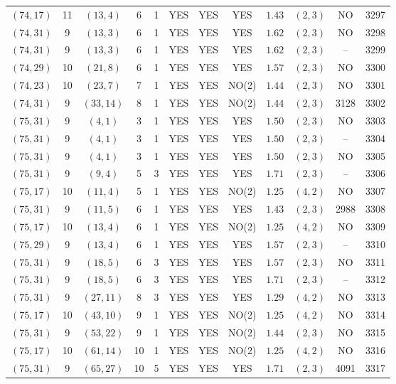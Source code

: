 \begin{longtable}{|c|c|c|c|c|c|c|c|c|c|c|c|}
$(74,17)$ & 11 & $(13,4)$ & 6 & 1 & YES & YES & YES & $1.43$ & $(2,3)$ & NO & 3297\\
$(74,31)$ & 9 & $(13,3)$ & 6 & 1 & YES & YES & YES & $1.62$ & $(2,3)$ & NO & 3298\\
$(74,31)$ & 9 & $(13,3)$ & 6 & 1 & YES & YES & YES & $1.62$ & $(2,3)$ & -- & 3299\\
$(74,29)$ & 10 & $(21,8)$ & 6 & 1 & YES & YES & YES & $1.57$ & $(2,3)$ & NO & 3300\\
$(74,23)$ & 10 & $(23,7)$ & 7 & 1 & YES & YES & NO(2) & $1.44$ & $(2,3)$ & NO & 3301\\
$(74,31)$ & 9 & $(33,14)$ & 8 & 1 & YES & YES & NO(2) & $1.44$ & $(2,3)$ & 3128 & 3302\\
$(75,31)$ & 9 & $(4,1)$ & 3 & 1 & YES & YES & YES & $1.50$ & $(2,3)$ & NO & 3303\\
$(75,31)$ & 9 & $(4,1)$ & 3 & 1 & YES & YES & YES & $1.50$ & $(2,3)$ & -- & 3304\\
$(75,31)$ & 9 & $(4,1)$ & 3 & 1 & YES & YES & YES & $1.50$ & $(2,3)$ & NO & 3305\\
$(75,31)$ & 9 & $(9,4)$ & 5 & 3 & YES & YES & YES & $1.71$ & $(2,3)$ & -- & 3306\\
$(75,17)$ & 10 & $(11,4)$ & 5 & 1 & YES & YES & NO(2) & $1.25$ & $(4,2)$ & NO & 3307\\
$(75,31)$ & 9 & $(11,5)$ & 6 & 1 & YES & YES & YES & $1.43$ & $(2,3)$ & 2988 & 3308\\
$(75,17)$ & 10 & $(13,4)$ & 6 & 1 & YES & YES & NO(2) & $1.25$ & $(4,2)$ & NO & 3309\\
$(75,29)$ & 9 & $(13,4)$ & 6 & 1 & YES & YES & YES & $1.57$ & $(2,3)$ & -- & 3310\\
$(75,31)$ & 9 & $(18,5)$ & 6 & 3 & YES & YES & YES & $1.57$ & $(2,3)$ & NO & 3311\\
$(75,31)$ & 9 & $(18,5)$ & 6 & 3 & YES & YES & YES & $1.71$ & $(2,3)$ & -- & 3312\\
$(75,31)$ & 9 & $(27,11)$ & 8 & 3 & YES & YES & YES & $1.29$ & $(4,2)$ & NO & 3313\\
$(75,17)$ & 10 & $(43,10)$ & 9 & 1 & YES & YES & NO(2) & $1.25$ & $(4,2)$ & NO & 3314\\
$(75,31)$ & 9 & $(53,22)$ & 9 & 1 & YES & YES & NO(2) & $1.44$ & $(2,3)$ & NO & 3315\\
$(75,17)$ & 10 & $(61,14)$ & 10 & 1 & YES & YES & NO(2) & $1.25$ & $(4,2)$ & NO & 3316\\
$(75,31)$ & 9 & $(65,27)$ & 10 & 5 & YES & YES & YES & $1.71$ & $(2,3)$ & 4091 & 3317\\

\end{longtable}
